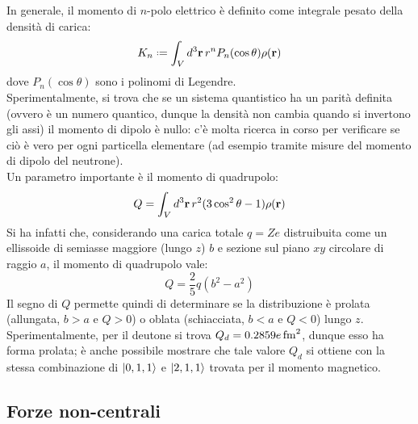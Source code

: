 In generale, il momento di $ n $-polo elettrico è definito come integrale pesato della densità di carica:
\begin{equation}
	K_n \defeq \int_V d^3\ve{r} \, r^n P_n(\cos \theta) \rho(\ve{r})
	\label{eq:4.16}
\end{equation}
dove $ P_n(\cos \theta) $ sono i polinomi di Legendre.\\
Sperimentalmente, si trova che se un sistema quantistico ha un parità definita (ovvero è un numero quantico, dunque la densità non cambia quando si invertono gli assi) il momento di dipolo è nullo: c'è molta ricerca in corso per verificare se ciò è vero per ogni particella elementare (ad esempio tramite misure del momento di dipolo del neutrone).\\
Un parametro importante è il momento di quadrupolo:
\begin{equation}
	Q = \int_V d^3\mathbf{r} \, r^2 (3\cos^2 \theta - 1) \rho(\mathbf{r})
	\label{eq:4.17}
\end{equation}
Si ha infatti che, considerando una carica totale $ q = Ze $ distruibuita come un ellissoide di semiasse maggiore (lungo $ z $) $ b $ e sezione sul piano $ xy $ circolare di raggio $ a $, il momento di quadrupolo vale:
\begin{equation}
	Q = \frac{2}{5} q (b^2 - a^2)
	\label{eq:4.18}
\end{equation}
Il segno di $ Q $ permette quindi di determinare se la distribuzione è prolata (allungata, $ b > a $ e $ Q > 0 $) o oblata (schiacciata, $ b < a $ e $ Q < 0 $) lungo $ z $. Sperimentalmente, per il deutone si trova $ Q_d = 0.2859 e\,\mathrm{fm}^2 $, dunque esso ha forma prolata; è anche possibile mostrare che tale valore $ Q_d $ si ottiene con la stessa combinazione di $ \ket{0,1,1} $ e $ \ket{2,1,1} $ trovata per il momento magnetico.

\subsection{Forze non-centrali}

